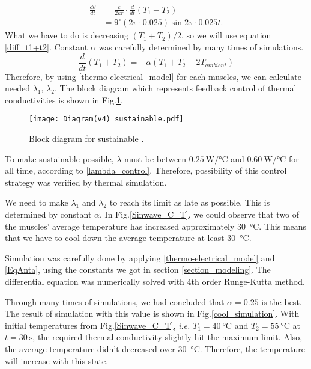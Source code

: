 \begin{equation} \label{theta_diff}
\begin{aligned} 
\frac{d\theta}{dt} & = \frac{c}{2kr}\cdot\frac{d}{dt}(T_{1}-T_{2}) \\
& = 9^{\circ}(2\pi\cdot 0.025)\sin{2\pi\cdot 0.025t}.
\end{aligned}
\end{equation}
What we have to do is decreasing $(T_{1}+T_{2})/2$, so we will use equation \eqref{diff_t1+t2}. Constant $\alpha$ was carefully determined by many times of simulations.
\begin{equation} \label{diff_t1+t2}
\frac{d}{dt}(T_{1}+T_{2}) = -\alpha(T_{1}+T_{2}-2T_{ambient})
\end{equation}
Therefore, by using \eqref{thermo-electrical_model} for each muscles, we can calculate needed $\lambda_{1}$, $\lambda_{2}$. The block diagram which represents feedback control of thermal conductivities is shown in Fig.\ref{diagram_sustainable}.

\begin{figure}[t]
	\centering\texttt{[image: Diagram(v4)\_sustainable.pdf]}
	\caption{Block diagram for sustainable \apcnospace.}
	\label{diagram_sustainable}
\end{figure}

To make sustainable \apc possible, $\lambda$ must be between $\SI{0.25}{\watt\per\degreeCelsius}$ and $\SI{0.60}{\watt\per\degreeCelsius}$ for all time, according to \eqref{lambda_control}. Therefore, possibility of this control strategy was verified by thermal simulation.

We need to make $\lambda_{1}$ and $\lambda_{2}$ to reach its limit as late as possible. This is determined by constant $\alpha$. 
In Fig.\ref{Sinwave_C_T}, we could observe that two of the muscles' average temperature has increased approximately \SI{30}{\degreeCelsius}. This means that we have to cool down the average temperature at least \SI{30}{\degreeCelsius}. 

Simulation was carefully done by applying \eqref{thermo-electrical_model} and \eqref{EqAnta}, using the constants we got in section \ref{section_modeling}. The differential equation was numerically solved with 4th order Runge-Kutta method. 

Through many times of simulations, we had concluded that $\alpha = 0.25$ is the best. The result of simulation with this value is shown in Fig.\ref{cool_simulation}. With initial temperatures from Fig.\ref{Sinwave_C_T}, {\it i.e.} $T_{1}=\SI{40}{\degreeCelsius}$ and $T_{2}=\SI{55}{\degreeCelsius}$ at $t=\SI{30}{\second}$, the required thermal conductivity slightly hit the maximum limit. Also, the average temperature didn't decreased over \SI{30}{\degreeCelsius}. Therefore, the temperature will increase with this state.

